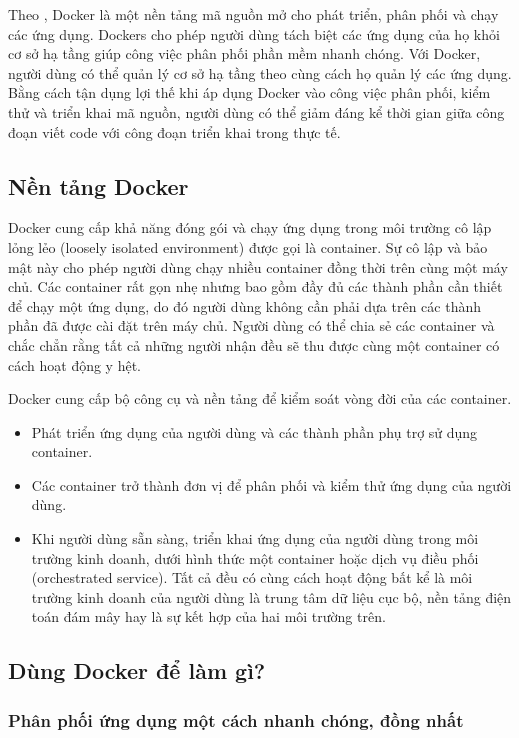 Theo \autocite{docker}, Docker là một nền tảng mã nguồn mở cho phát triển, phân phối và chạy các ứng dụng. Dockers cho phép người dùng tách biệt các ứng dụng của họ khỏi cơ sở hạ tầng giúp công việc phân phối phần mềm nhanh chóng. Với Docker, người dùng có thể quản lý cơ sở hạ tầng theo cùng cách họ quản lý các ứng dụng. Bằng cách tận dụng lợi thế khi áp dụng Docker vào công việc phân phối, kiểm thử và triển khai mã nguồn, người dùng có thể giảm đáng kể thời gian giữa công đoạn viết code với công đoạn triển khai trong thực tế.

\subsection{Nền tảng Docker}

Docker cung cấp khả năng đóng gói và chạy ứng dụng trong môi trường cô lập lỏng lẻo (loosely isolated environment) được gọi là container. Sự cô lập và bảo mật này cho phép người dùng chạy nhiều container đồng thời trên cùng một máy chủ. Các container rất gọn nhẹ nhưng bao gồm đầy đủ các thành phần cần thiết để chạy một ứng dụng, do đó người dùng không cần phải dựa trên các thành phần đã được cài đặt trên máy chủ. Người dùng có thể chia sẻ các container và chắc chẳn rằng tất cả những người nhận đều sẽ thu được cùng một container có cách hoạt động y hệt.

Docker cung cấp bộ công cụ và nền tảng để kiểm soát vòng đời của các container.

\begin{itemize}
    \item Phát triển ứng dụng của người dùng và các thành phần phụ trợ sử dụng container.
    \item Các container trở thành đơn vị để phân phối và kiểm thử ứng dụng của người dùng.
    \item Khi người dùng sẵn sàng, triển khai ứng dụng của người dùng trong môi trường kinh doanh, dưới hình thức một container hoặc dịch vụ điều phối (orchestrated service). Tất cả đều có cùng cách hoạt động bất kể là môi trường kinh doanh của người dùng là trung tâm dữ liệu cục bộ, nền tảng điện toán đám mây hay là sự kết hợp của hai môi trường trên.
\end{itemize}

\subsection{Dùng Docker để làm gì?}

\subsubsection{Phân phối ứng dụng một cách nhanh chóng, đồng nhất}

